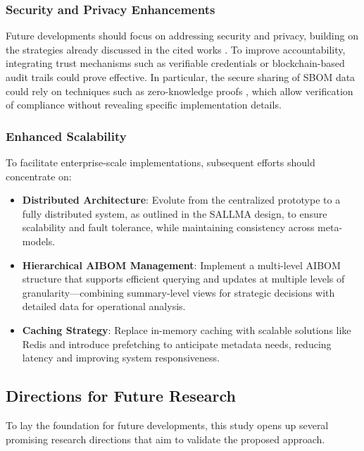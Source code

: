 \subsubsection{Security and Privacy Enhancements}
Future developments should focus on addressing security and privacy, building on the strategies already discussed in the cited works \cite{xia2024trust, barclay2022providing}. To improve accountability, integrating trust mechanisms such as verifiable credentials or blockchain-based audit trails could prove effective. In particular, the secure sharing of SBOM data could rely on techniques such as zero-knowledge proofs \cite{w3c_zkp}, which allow verification of compliance without revealing specific implementation details.



\subsubsection{Enhanced Scalability}
To facilitate enterprise-scale implementations, subsequent efforts should concentrate on:

\begin{itemize}[leftmargin=*, label=--]
\item\textbf{Distributed Architecture}: Evolute from the centralized prototype to a fully distributed system, as outlined in the SALLMA design, to ensure scalability and fault tolerance, while maintaining consistency across meta-models.

\item\textbf{Hierarchical AIBOM Management}: Implement a multi-level AIBOM structure that supports efficient querying and updates at multiple levels of granularity—combining summary-level views for strategic decisions with detailed data for operational analysis.

\item\textbf{Caching Strategy}: Replace in-memory caching with scalable solutions like Redis and introduce prefetching to anticipate metadata needs, reducing latency and improving system responsiveness.
\end{itemize}



\subsection{Directions for Future Research}

To lay the foundation for future developments, this study opens up several promising research directions that aim to validate the proposed approach. 

